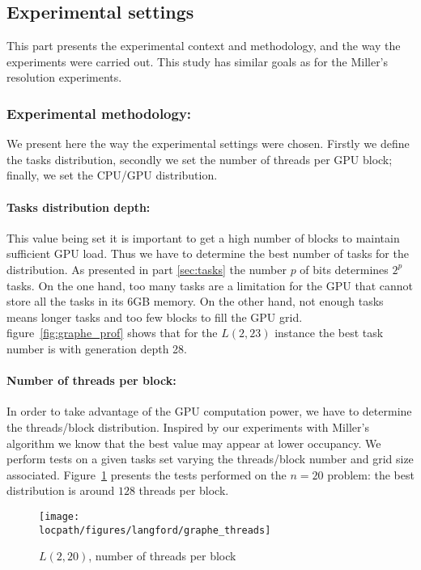 \subsection{Experimental settings}
This part presents the experimental context and methodology, and the way the experiments were carried out.
This study has similar goals as for the Miller's resolution experiments.

\subsubsection{Experimental methodology: }
We present here the way the experimental settings were chosen.
Firstly we define the tasks distribution, secondly we set the number of threads per GPU block; finally, we set the CPU/GPU distribution.

\paragraph{Tasks distribution depth: }
This value being set it is important to get a high number of blocks to maintain sufficient GPU load.
Thus we have to determine the best number of tasks for the distribution. As presented in part \ref{sec:tasks} the number $p$ of bits determines $2^p$ tasks. On the one hand, too many tasks are a limitation for the GPU that cannot store all the tasks in its 6GB memory. On the other hand, not enough tasks means longer tasks and too few blocks to fill the GPU grid. figure~\ref{fig:graphe_prof} shows that for the $L(2,23)$ instance the best task number is with generation depth 28.

\paragraph{Number of threads per block: }
In order to take advantage of the GPU computation power, we have to determine the threads/block distribution. Inspired by our experiments with Miller's algorithm we know that the best value may appear at lower occupancy. We perform tests on a given tasks set varying the threads/block number and grid size associated. 
Figure~\ref{fig:graphe_threads} presents the tests performed on the $n=20$ problem: the best distribution is around $128$ threads per block. 
\begin{figure}[t!]
\centering 
\texttt{[image: \\locpath/figures/langford/graphe\_threads]}
\caption{$L(2,20)$, number of threads per block}
\label{fig:graphe_threads}
\end{figure}

